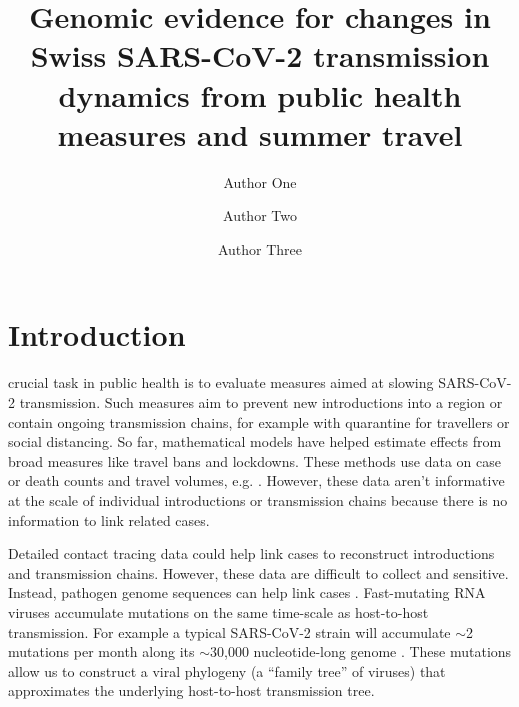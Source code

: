 \documentclass[9pt,twoside,lineno]{pnas-new} %
\title{Genomic evidence for changes in Swiss SARS-CoV-2 transmission dynamics from public health measures and summer travel}
\author[a,c,1]{Author One}
\author[b,1,2]{Author Two}
\author[a]{Author Three}
\affil[a]{Affiliation One}
\affil[b]{Affiliation Two}
\affil[c]{Affiliation Three}
\begin{document}
\maketitle
\thispagestyle{firststyle}



\section{Introduction}

 crucial task in public health is to evaluate measures aimed at slowing SARS-CoV-2 transmission. Such measures aim to prevent new introductions into a region or contain ongoing transmission chains, for example with quarantine for travellers or social distancing. So far, mathematical models have helped estimate effects from broad measures like travel bans and lockdowns. These methods use data on case or death counts and travel volumes, e.g. \cite{Flaxman2020, Tian2020}. However, these data aren't informative at the scale of individual introductions or transmission chains because there is no information to link related cases.

Detailed contact tracing data could help link cases to reconstruct introductions and transmission chains. However, these data are difficult to collect and sensitive. Instead, pathogen genome sequences can help link cases \cite{Kraemer}. Fast-mutating RNA viruses accumulate mutations on the same time-scale as host-to-host transmission. For example a typical SARS-CoV-2 strain will accumulate $\sim$2 mutations per month along its $\sim$30,000 nucleotide-long genome \cite{Nextstrainteam}. These mutations allow us to construct a viral phylogeny (a ``family tree'' of viruses) that approximates the underlying host-to-host transmission tree. 
\end{document}
